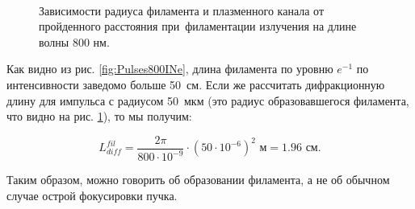 

\begin{figure}[H]
    \begin{center}
        \begin{minipage}{\minipagewidthtwo}
        \end{minipage}
        \hfill
        \begin{minipage}{\minipagewidthtwo}
        \end{minipage}
        \\[1ex]
        \caption{Зависимости радиуса филамента и плазменного канала от пройденного расстояния при~филаментации излучения на длине волны 800 нм.}
        \label{fig:Pulses800RFilPl}
    \end{center}
\end{figure}


Как видно из рис. \ref{fig:Pulses800INe}, длина филамента по уровню $e^{-1}$ по интенсивности заведомо больше 50~см.
Если же рассчитать дифракционную длину для импульса с радиусом 50~мкм (это радиус образовавшегося филамента,
что видно на рис. \ref{fig:Pulses800RFilPl}), то мы получим:

\begin{equation}
L_{diff}^{fil} = \frac{2\pi}{800 \cdot 10^{-9}} \cdot (50 \cdot 10^{-6})^2 \textrm{ м} = 1.96 \textrm{ см}.
\end{equation}

\noindent Таким образом, можно говорить об образовании филамента, а не об обычном случае острой фокусировки пучка.


